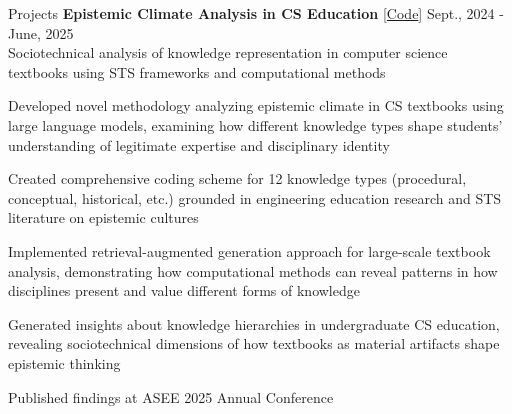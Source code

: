 \documentclass{resume}
\begin{document}
\begin{rSection}{Projects}
{\bf Epistemic Climate Analysis in CS Education}{\hspace{2em} [\href{https://github.com/mitchg10/NLP_FinalProject}{Code}]} \hfill {Sept., 2024 - June, 2025} \\
Sociotechnical analysis of knowledge representation in computer science textbooks using STS frameworks and computational methods
\begin{cvitems}
    \item Developed novel methodology analyzing epistemic climate in CS textbooks using large language models, examining how different knowledge types shape students' understanding of legitimate expertise and disciplinary identity
    \item Created comprehensive coding scheme for 12 knowledge types (procedural, conceptual, historical, etc.) grounded in engineering education research and STS literature on epistemic cultures
    \item Implemented retrieval-augmented generation approach for large-scale textbook analysis, demonstrating how computational methods can reveal patterns in how disciplines present and value different forms of knowledge
    \item Generated insights about knowledge hierarchies in undergraduate CS education, revealing sociotechnical dimensions of how textbooks as material artifacts shape epistemic thinking
    \item Published findings at ASEE 2025 Annual Conference
\end{cvitems}

\end{rSection}

\end{document}

